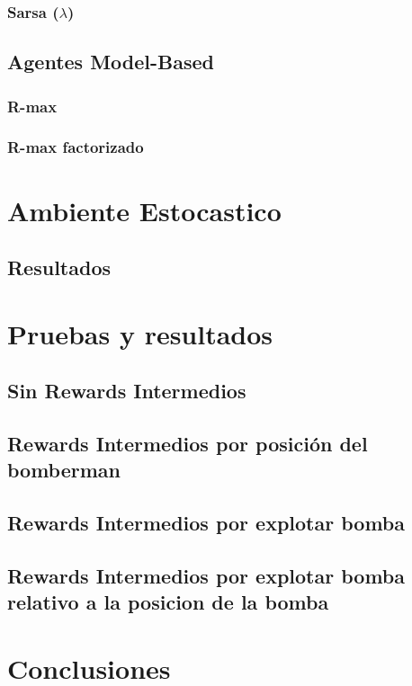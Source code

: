 \documentclass[a4paper,spanish] {article}
\begin{document}
		\subsubsection{Sarsa ($\lambda$)}	
	\subsection{Agentes Model-Based}	
		\subsubsection{R-max}
		\subsubsection{R-max factorizado}

\section{Ambiente Estocastico}
	\subsection{Resultados}
	



\section{Pruebas y resultados}
	\subsection{Sin Rewards Intermedios}
	\subsection{Rewards Intermedios por posición del bomberman}
	\subsection{Rewards Intermedios por explotar bomba}
	\subsection{Rewards Intermedios por explotar bomba relativo a la posicion de la bomba}

\section{Conclusiones}


	





		


		
		

		
		
		
		
\newpage
\tableofcontents
\newpage
	 
	
\end{document}
